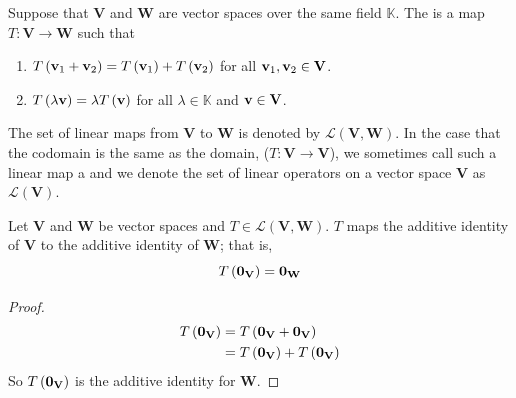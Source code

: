 \begin{dfn}
    Suppose that \( \mathbf{V} \) and \( \mathbf{W} \) are vector spaces over the same field \( \mathbb{K} \). The  is a map \( T: \mathbf{V} \to \mathbf{W} \) such that 
    \begin{enumerate}[label=\textbf{\roman*)}]
        \item \( T \left( \vb{v}_{1} + \vb{v}_{2} \right) = T \left(  \vb{v}_{1} \right) + T \left( \vb{v}_{2} \right) \) for all \( \vb{v}_{1}, \vb{v}_{2} \in \mathbf{V} \). 
        \item \( T \left( \lambda \vb{v} \right) = \lambda T \left( \vb{v} \right) \) for all \( \lambda \in \mathbb{K} \) and \( \vb{v} \in \mathbf{V} \).
    \end{enumerate}
    The set of linear maps from \( \mathbf{V} \) to \( \mathbf{W} \) is denoted by \( \mathcal{L} \left( \mathbf{V}, \mathbf{W} \right) \). In the case that the codomain is the same as the domain, (\( T: \mathbf{V} \to \mathbf{V} \)), we sometimes call such a linear map a  and we denote the set of linear operators on a vector space \( \mathbf{V} \) as \( \mathcal{L} \left( \mathbf{V} \right) \).
\end{dfn}

\begin{lemma}\label{thm:linear-maps-0-to-0}
    Let \( \mathbf{V} \) and \( \mathbf{W} \) be vector spaces and \( T \in \mathcal{L} \left( \mathbf{V}, \mathbf{W} \right) \). \( T \) maps the additive identity of \( \mathbf{V} \) to the additive identity of \( \mathbf{W} \); that is, 
    \[ T \left( \vb{0}_{\mathbf{V}} \right) = \vb{0}_{\mathbf{W}}\]
\end{lemma}
\begin{proof}
    \begin{align*}
        T \left( \vb{0}_{\mathbf{V}} \right) &= T \left(\vb{0}_{\mathbf{V}} + \vb{0}_{\mathbf{V}}  \right) \\
        &= T \left( \vb{0}_{\mathbf{V}} \right) + T \left( \vb{0}_{\mathbf{V}} \right)
    \end{align*}
    So \( T \left( \vb{0}_{\mathbf{V}} \right) \) is the additive identity for \( \mathbf{W} \).
\end{proof}


